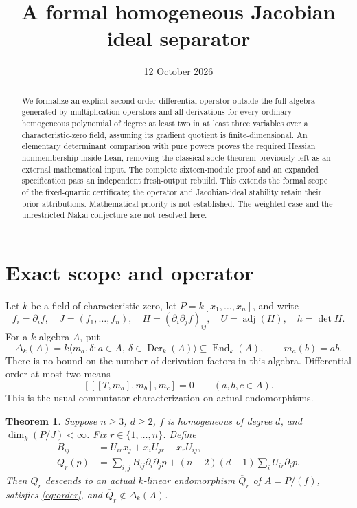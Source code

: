 \documentclass[11pt,letterpaper]{article}
\title{A formal homogeneous Jacobian ideal separator}
\author{}
\date{12 October 2026}
\newtheorem{theorem}{Theorem}[section]
\DeclareMathOperator{\Der}{Der}
\DeclareMathOperator{\End}{End}
\DeclareMathOperator{\adj}{adj}
\begin{document}
\maketitle
\begin{abstract}
We formalize an explicit second-order differential operator outside the full
algebra generated by multiplication operators and all derivations for every
ordinary homogeneous polynomial of degree at least two in at least three
variables over a characteristic-zero field, assuming its gradient quotient is
finite-dimensional. An elementary determinant comparison with pure powers
proves the required Hessian nonmembership inside Lean, removing the classical
socle theorem previously left as an external mathematical input. The complete
sixteen-module proof and an expanded specification pass an independent
fresh-output rebuild. This extends the formal scope of the fixed-quartic
certificate; the operator and Jacobian-ideal stability retain their prior
attributions. Mathematical priority is not established. The weighted case and
the unrestricted Nakai conjecture are not resolved here.
\end{abstract}

\section{Exact scope and operator}
Let \(k\) be a field of characteristic zero, let
\(P=k[x_1,\ldots,x_n]\), and write
\[
 f_i=\partial_i f,\quad J=(f_1,\ldots,f_n),\quad
 H=(\partial_i\partial_j f)_{ij},\quad U=\adj(H),\quad h=\det H.
\]
For a \(k\)-algebra \(A\), put
\[
 \Delta_k(A)=k\langle m_a,\delta : a\in A,\ \delta\in\Der_k(A)\rangle
 \subseteq\End_k(A),\qquad m_a(b)=ab.
\]
There is no bound on the number of derivation factors in this algebra.
Differential order at most two means
\begin{equation}\label{eq:order}
 [[[T,m_a],m_b],m_c]=0\qquad(a,b,c\in A).
\end{equation}
This is the usual commutator characterization on actual endomorphisms.

\begin{theorem}\label{thm:main}
Suppose \(n\ge3\), \(d\ge2\), \(f\) is homogeneous of degree \(d\), and
\(\dim_k(P/J)<\infty\). Fix \(r\in\{1,\ldots,n\}\). Define
\begin{align}
 B_{ij}&=U_{ir}x_j+x_iU_{jr}-x_rU_{ij},\label{eq:B}\\
 Q_r(p)&=\sum_{i,j}B_{ij}\partial_i\partial_jp
 +(n-2)(d-1)\sum_iU_{ir}\partial_ip.\label{eq:Q}
\end{align}
Then \(Q_r\) descends to an actual \(k\)-linear endomorphism \(\overline Q_r\)
of \(A=P/(f)\), satisfies \eqref{eq:order}, and
\(\overline Q_r\notin\Delta_k(A)\).
\end{theorem}
\end{document}
